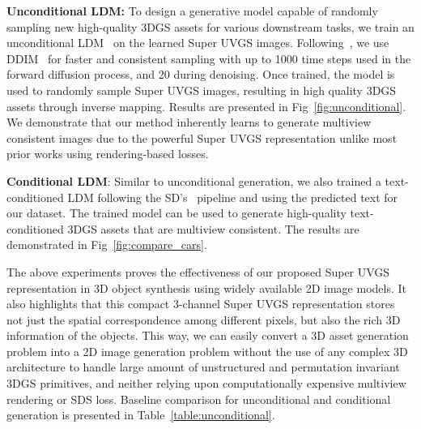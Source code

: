 
\noindent\textbf{Unconditional LDM:}
To design a generative model capable of randomly sampling new high-quality 3DGS assets for various downstream tasks, we train an unconditional LDM~\cite{stable_diffusion} on the learned Super UVGS images. 
Following~\cite{stable_diffusion, controlnet, egosonics}, we use DDIM~\cite{ddim} for faster and consistent sampling with up to 1000 time steps used in the forward diffusion process, and 20 during denoising. 
Once trained, the model is used to randomly sample Super UVGS images, resulting in high quality 3DGS assets through inverse mapping. Results are presented in Fig~\ref{fig:unconditional}. We demonstrate that our method inherently learns to generate multiview consistent images due to the powerful Super UVGS representation unlike most prior works using rendering-based losses. 

\noindent\textbf{Conditional LDM}:
Similar to unconditional generation, we also trained a text-conditioned LDM following the SD's~\cite{stable_diffusion, controlnet, egosonics} pipeline and using the predicted text for our dataset.
%
The trained model can be used to generate high-quality text-conditioned 3DGS assets that are multiview consistent. The results are demonstrated in Fig~\ref{fig:compare_cars}. 





The above experiments proves the effectiveness of our proposed Super UVGS representation in 3D object synthesis using widely available 2D image models. It also highlights that this compact 3-channel Super UVGS representation stores not just the spatial correspondence among different pixels, but also the rich 3D information of the objects. This way, we can easily convert a 3D asset generation problem into a 2D image generation problem without the use of any complex 3D architecture to handle large amount of unstructured and permutation invariant 3DGS primitives, and neither relying upon computationally expensive multiview rendering or SDS loss. Baseline comparison for unconditional and conditional generation is presented in Table~\ref{table:unconditional}.









